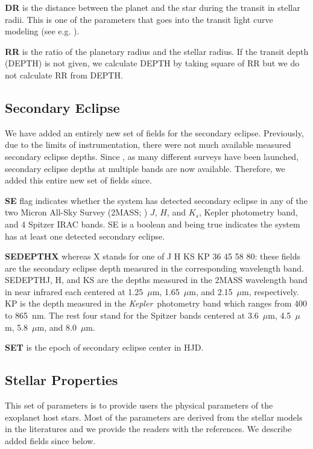 \documentclass[11pt,preprint]{aastex}
\def\micron{$\mu$m}
\def\kepler{\textit{Kepler}}
\def\micron{$\mu$m}
\begin{document}
\begin{CJK*}{UTF8}{gbsn}
{\bf DR} is the distance between the planet and the star during the
transit in stellar radii. This is one of the parameters that goes into
the transit light curve modeling (see e.g. \citealt{Batalha2013}).

{\bf RR} is the ratio of the planetary radius and the stellar
radius. If the transit depth (DEPTH) is not given, we calculate DEPTH
by taking square of RR but we do not calculate RR from DEPTH.


\subsection{Secondary Eclipse}\label{sec:se}

We have added an entirely new set of fields for the secondary
eclipse. Previously, due to the limits of instrumentation, there were
not much available measured secondary eclipse depths. Since
\cite{Wright2011}, as many different surveys have been launched,
secondary eclipse depths at multiple bands are now
available. Therefore, we added this entire new set of fields since.

{\bf SE} flag indicates whether the system has detected secondary
eclipse in any of the two Micron All-Sky Survey (2MASS;
\citealt{Skrustskie2006}) $J$, $H$, and $K_s$, Kepler photometry band,
and 4 Spitzer IRAC bands. SE is a boolean and being true indicates the
system has at least one detected secondary eclipse.

{\bf SEDEPTHX} whereas X stands for one of J H KS KP 36 45 58 80:
these fields are the secondary eclipse depth measured in the
corresponding wavelength band. SEDEPTHJ, H, and KS are the depths
measured in the 2MASS wavelength band in near infrared each centered
at 1.25~\micron, 1.65~\micron, and 2.15~\micron, respectively. KP is
the depth measured in the \kepler\ photometry band which ranges from
400 to 865~nm. The rest four stand for the Spitzer bands centered at
3.6~\micron, 4.5~\micron, 5.8~\micron, and 8.0~\micron.

{\bf SET} is the epoch of secondary eclipse center in HJD.

\subsection{Stellar Properties}\label{sec:stellarprop}

This set of parameters is to provide users the physical parameters of
the exoplanet host stars.  Most of the parameters are derived from the
stellar models in the literatures and we provide the readers with the
references. We describe added fields since \cite{Wright2011} below.


\end{CJK*}
\end{document}
